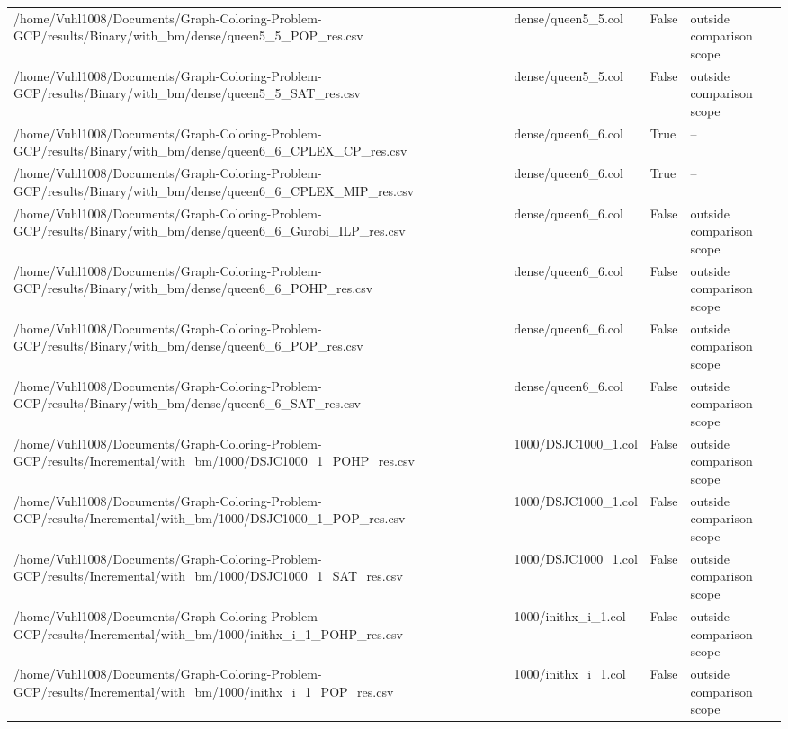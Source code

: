 \begin{table}[htbp]
\begin{tabular}{llll}
/home/Vuhl1008/Documents/Graph-Coloring-Problem-GCP/results/Binary/with\_bm/dense/queen5\_5\_POP\_res.csv & dense/queen5\_5.col & False & outside comparison scope \\
/home/Vuhl1008/Documents/Graph-Coloring-Problem-GCP/results/Binary/with\_bm/dense/queen5\_5\_SAT\_res.csv & dense/queen5\_5.col & False & outside comparison scope \\
/home/Vuhl1008/Documents/Graph-Coloring-Problem-GCP/results/Binary/with\_bm/dense/queen6\_6\_CPLEX\_CP\_res.csv & dense/queen6\_6.col & True & -- \\
/home/Vuhl1008/Documents/Graph-Coloring-Problem-GCP/results/Binary/with\_bm/dense/queen6\_6\_CPLEX\_MIP\_res.csv & dense/queen6\_6.col & True & -- \\
/home/Vuhl1008/Documents/Graph-Coloring-Problem-GCP/results/Binary/with\_bm/dense/queen6\_6\_Gurobi\_ILP\_res.csv & dense/queen6\_6.col & False & outside comparison scope \\
/home/Vuhl1008/Documents/Graph-Coloring-Problem-GCP/results/Binary/with\_bm/dense/queen6\_6\_POHP\_res.csv & dense/queen6\_6.col & False & outside comparison scope \\
/home/Vuhl1008/Documents/Graph-Coloring-Problem-GCP/results/Binary/with\_bm/dense/queen6\_6\_POP\_res.csv & dense/queen6\_6.col & False & outside comparison scope \\
/home/Vuhl1008/Documents/Graph-Coloring-Problem-GCP/results/Binary/with\_bm/dense/queen6\_6\_SAT\_res.csv & dense/queen6\_6.col & False & outside comparison scope \\
/home/Vuhl1008/Documents/Graph-Coloring-Problem-GCP/results/Incremental/with\_bm/1000/DSJC1000\_1\_POHP\_res.csv & 1000/DSJC1000\_1.col & False & outside comparison scope \\
/home/Vuhl1008/Documents/Graph-Coloring-Problem-GCP/results/Incremental/with\_bm/1000/DSJC1000\_1\_POP\_res.csv & 1000/DSJC1000\_1.col & False & outside comparison scope \\
/home/Vuhl1008/Documents/Graph-Coloring-Problem-GCP/results/Incremental/with\_bm/1000/DSJC1000\_1\_SAT\_res.csv & 1000/DSJC1000\_1.col & False & outside comparison scope \\
/home/Vuhl1008/Documents/Graph-Coloring-Problem-GCP/results/Incremental/with\_bm/1000/inithx\_i\_1\_POHP\_res.csv & 1000/inithx\_i\_1.col & False & outside comparison scope \\
/home/Vuhl1008/Documents/Graph-Coloring-Problem-GCP/results/Incremental/with\_bm/1000/inithx\_i\_1\_POP\_res.csv & 1000/inithx\_i\_1.col & False & outside comparison scope \\

\end{tabular}
\end{table}

